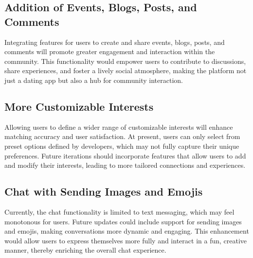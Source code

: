 \subsection{Addition of Events, Blogs, Posts, and Comments}
Integrating features for users to create and share events, blogs, posts, and comments will promote greater engagement and interaction within the community. This functionality would empower users to contribute to discussions, share experiences, and foster a lively social atmosphere, making the platform not just a dating app but also a hub for community interaction.

\subsection{More Customizable Interests}
Allowing users to define a wider range of customizable interests will enhance matching accuracy and user satisfaction. At present, users can only select from preset options defined by developers, which may not fully capture their unique preferences. Future iterations should incorporate features that allow users to add and modify their interests, leading to more tailored connections and experiences.

\subsection{Chat with Sending Images and Emojis}
Currently, the chat functionality is limited to text messaging, which may feel monotonous for users. Future updates could include support for sending images and emojis, making conversations more dynamic and engaging. This enhancement would allow users to express themselves more fully and interact in a fun, creative manner, thereby enriching the overall chat experience.
